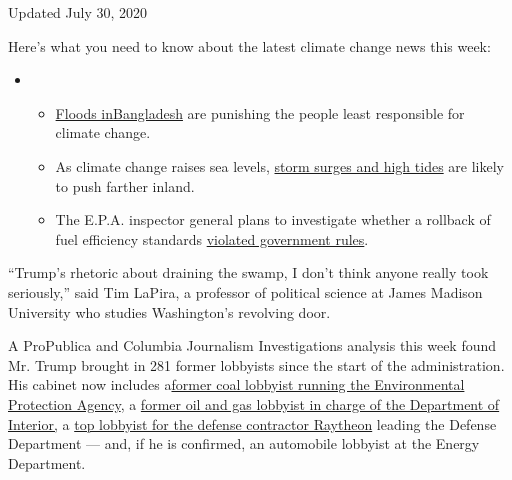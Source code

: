 Updated July 30, 2020

Here's what you need to know about the latest climate change news this
week:

\begin{itemize}
\item
  \begin{itemize}
  \tightlist
  \item
    \href{https://www.nytimes.com/2020/07/30/climate/bangladesh-floods.html?action=click\&pgtype=Article\&state=default\&region=MAIN_CONTENT_1\&context=storylines_keepup}{Floods
    in}\href{https://www.nytimes.com/2020/07/30/climate/bangladesh-floods.html?action=click\&pgtype=Article\&state=default\&region=MAIN_CONTENT_1\&context=storylines_keepup}{Bangladesh}
    are punishing the people least responsible for climate change.
  \item
    As climate change raises sea levels,
    \href{https://www.nytimes.com/2020/07/30/climate/sea-level-inland-floods.html?action=click\&pgtype=Article\&state=default\&region=MAIN_CONTENT_1\&context=storylines_keepup}{storm
    surges and high tides} are likely to push farther inland.
  \item
    The E.P.A. inspector general plans to investigate whether a rollback
    of fuel efficiency standards
    \href{https://www.nytimes.com/2020/07/27/climate/trump-fuel-efficiency-rule.html?action=click\&pgtype=Article\&state=default\&region=MAIN_CONTENT_1\&context=storylines_keepup}{violated
    government rules}.
  \end{itemize}
\end{itemize}

``Trump's rhetoric about draining the swamp, I don't think anyone really
took seriously,'' said Tim LaPira, a professor of political science at
James Madison University who studies Washington's revolving door.

A ProPublica and Columbia Journalism Investigations analysis this week
found Mr. Trump brought in 281 former lobbyists since the start of the
administration. His cabinet now includes
a\href{https://www.nytimes.com/2018/08/01/climate/andrew-wheeler-epa-lobbying.html}{former
coal lobbyist running the Environmental Protection Agency}, a
\href{https://www.nytimes.com/2019/04/04/climate/david-bernhardt-interior-lobbying.html}{former
oil and gas lobbyist in charge of the Department of Interior,} a
\href{https://www.nytimes.com/2019/07/23/us/politics/mark-esper-secretary-defense.html}{top
lobbyist for the defense contractor Raytheon} leading the Defense
Department --- and, if he is confirmed, an automobile lobbyist at the
Energy Department.

